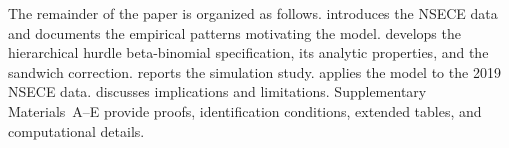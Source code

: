 
The remainder of the paper is organized as follows.
 introduces the NSECE data and documents the empirical
patterns motivating the model.
 develops the hierarchical hurdle beta-binomial
specification, its analytic properties, and the sandwich correction.
 reports the simulation study.
 applies the model to the 2019 NSECE data.
 discusses implications and limitations.
Supplementary Materials~A--E provide proofs, identification conditions,
extended tables, and computational details.
